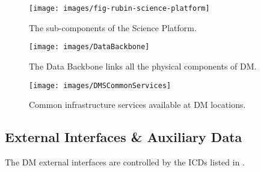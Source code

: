 \begin{figure}[htbp]
\begin{center}
\texttt{[image: images/fig-rubin-science-platform]}
\caption{The sub-components of the \gls{Science Platform}. \label{fig:sciplat}}
\end{center}
\end{figure}


\begin{figure}[htbp]
\begin{center}
\texttt{[image: images/DataBackbone]}
\caption{The \gls{Data Backbone} links all the physical components of \gls{DM}. \label{fig:databb}}
\end{center}
\end{figure}

\begin{figure}[htbp]
\begin{center}
 \texttt{[image: images/DMSCommonServices]}
\caption{Common infrastructure services available at \gls{DM} locations. \label{fig:dcs}}
\end{center}
\end{figure}



\subsection{External Interfaces \& Auxiliary Data}
The \gls{DM} external interfaces are controlled by the ICDs listed in .

